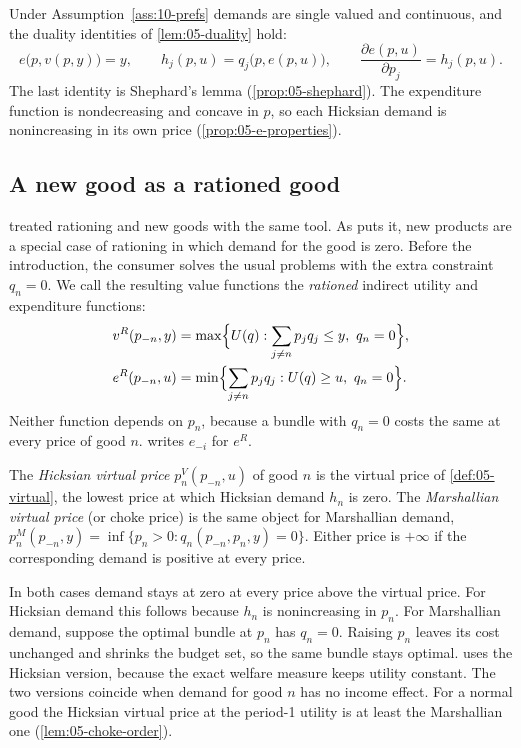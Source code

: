 Under Assumption~\ref{ass:10-prefs} demands are single valued and continuous, and the duality identities of
\cref{lem:05-duality} hold:
\begin{equation}\label{eq:10-duality}
  e\bigl(p,v(p,y)\bigr) = y, \qquad h_j(p,u) = q_j\bigl(p,e(p,u)\bigr), \qquad
  \frac{\partial e(p,u)}{\partial p_j} = h_j(p,u).
\end{equation}
The last identity is Shephard's lemma (\cref{prop:05-shephard}). The expenditure function is nondecreasing
and concave in $p$, so each Hicksian demand is nonincreasing in its own price (\cref{prop:05-e-properties}).

\subsection{A new good as a rationed good}\label{sec:10-rationing}

\citet{Hicks1940} treated rationing and new goods with the same tool. As \citet[p.~211]{Hausman1997} puts it,
new products are a special case of rationing in which demand for the good is zero. Before the introduction, the consumer solves the usual problems with the extra
constraint $q_n = 0$. We call the resulting value functions the \emph{rationed} indirect utility and
expenditure functions:
\begin{align}
  v^R(p_{-n},y) &= \max\Bigl\{U(q) : \sum_{j\neq n}p_jq_j \le y,\ q_n = 0\Bigr\}, \label{eq:10-vR}\\
  e^R(p_{-n},u) &= \min\Bigl\{\sum_{j\neq n}p_jq_j : U(q) \ge u,\ q_n = 0\Bigr\}. \label{eq:10-eR}
\end{align}
Neither function depends on $p_n$, because a bundle with $q_n = 0$ costs the same at every price of good $n$.
 writes $e_{-i}$ for $e^R$.

\begin{definition}\label{def:10-virtual}
The \emph{Hicksian virtual price} $p_n^V(p_{-n},u)$ of good $n$ is the virtual price of \cref{def:05-virtual},
the lowest price at which Hicksian demand $h_n$ is zero. The \emph{Marshallian virtual price} (or choke price) is
the same object for Marshallian demand, $p_n^M(p_{-n},y) = \inf\{p_n > 0 : q_n(p_{-n},p_n,y) = 0\}$. Either
price is $+\infty$ if the corresponding demand is positive at every price.
\end{definition}

In both cases demand stays at zero at every price above the virtual price. For Hicksian demand this follows
because $h_n$ is nonincreasing in $p_n$. For Marshallian demand, suppose the optimal bundle at $p_n$ has
$q_n = 0$. Raising $p_n$ leaves its cost unchanged and shrinks the budget set, so the same bundle stays
optimal. \citet[p.~212, n.~5]{Hausman1997} uses the Hicksian version, because the exact welfare measure keeps
utility constant. The two versions coincide when demand for good $n$ has no income effect. For a normal good
the Hicksian virtual price at the period-1 utility is at least the Marshallian one (\cref{lem:05-choke-order}).

